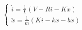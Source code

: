 \documentclass[preview]{standalone}
\begin{document}
\begin{align*}
\begin{cases}\dot{i} = \frac{1}{L}(V - Ri - K\dot{x}) \\\ddot{x} = \frac{1}{m}(Ki - kx - b\dot{x})\end{cases}
\end{align*}
\end{document}

